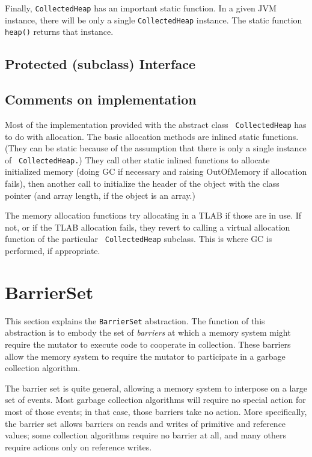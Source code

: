 \documentclass{article}
\begin{document}
Finally, {\tt CollectedHeap} has an important static function.  In a
given JVM instance, there will be only a single {\tt CollectedHeap}
instance.  The static function {\tt heap()} returns that instance.

\subsection{Protected (subclass) Interface}


\subsection{Comments on implementation}

Most of the implementation provided with the abstract class {\tt
CollectedHeap} has to do with allocation.  The basic allocation
methods are inlined static functions.  (They can be static because of
the assumption that there is only a single instance of {\tt
CollectedHeap.})  They call other static inlined functions to allocate
initialized memory (doing GC if necessary and raising OutOfMemory if
allocation fails), then another call to initialize the header of the
object with the class pointer (and array length, if the object is an
array.)

The memory allocation functions try allocating in a TLAB if those are
in use.  If not, or if the TLAB allocation fails, they revert to
calling a virtual allocation function of the particular {\tt
CollectedHeap} subclass.  This is where GC is performed, if
appropriate.

\section{BarrierSet}
\label{s:BarrierSet}

This section explains the {\tt BarrierSet} abstraction.  The function
of this abstraction is to embody the set of {\em barriers} at which a
memory system might require the mutator to execute code to cooperate
in collection.  These barriers allow the memory system to require the
mutator to participate in a garbage collection algorithm.

The barrier set is quite general, allowing a memory system to
interpose on a large set of events.  Most garbage collection
algorithms will require no special action for most of those events; in
that case, those barriers take no action.  More specifically, the
barrier set allows barriers on reads and writes of primitive and
reference values; some collection algorithms require no barrier at all,
and many others require actions only on reference writes.
\end{document}
